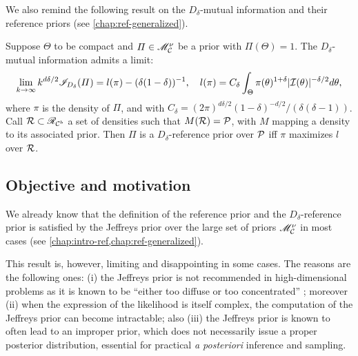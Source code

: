 We also remind the following result on the $D_\delta$-mutual information and their reference priors (see \cref{chap:ref-generalized}).
\begin{thm}\label{thm:BA:l(pi)}
    Suppose $\Theta$ to be compact and $\varPi\in\mathscr{M}^\nu_{\mathcal{C}}$ be a prior with $\varPi(\Theta)=1$. The $D_\delta$-mutual information admits a limit:
        \begin{equation}
            \lim_{k\rightarrow\infty} k^{d\delta/2} \mathscr{I}_{D_\delta}(\varPi) = l(\pi) - (\delta(1-\delta))^{-1}, \quad l(\pi) = C_\delta \int_{\Theta}\pi(\theta)^{1+\delta} |\mathcal{I}(\theta)|^{-\delta/2}  d\theta ,
        \end{equation}
        where $\pi$ is the density of $\varPi$, and with $C_\delta= (2\pi)^{d\delta/2} (1-\delta)^{-d/2}/(\delta(\delta-1))$.\\
    Call $\mathcal{R}\subset\mathscr{R}_{\mathcal{C}^b}$ a set of densities such that $M(\mathcal{R})=\mathcal{P}$, with $M$ mapping a density to its associated prior. Then
        $\varPi$ is a $D_\delta$-reference prior over $\mathcal{P}$ iff $\pi$ maximizes $l$ over $\mathcal{R}$. 
\end{thm}




\subsection{Objective and motivation}\label{sec:BA:mots}



We already know that the definition of the reference prior and the $D_\delta$-reference prior is satisfied by the Jeffreys prior over the large set of priors $\mathscr{M}^\nu_{\mathcal{C}}$ in most cases (see \cref{chap:intro-ref,chap:ref-generalized}).


This result is, however, limiting and disappointing in some cases. The reasons are the following ones: (i) the Jeffreys prior is not recommended in high-dimensional problems as it is known to be ``either too diffuse or too concentrated'' \citep{berger_overall_2015}; moreover (ii) when the expression of the likelihood is itself complex, the computation of the Jeffreys prior can become  intractable; %
also (iii) the Jeffreys prior is known to often lead to an improper prior, which does not necessarily issue a proper posterior distribution, essential for practical \emph{a posteriori} inference and sampling.

